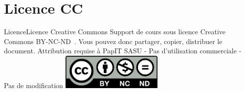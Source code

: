 \documentclass{beamer}
\begin{document}
    \section{Licence CC}\label{sec:licence}

    \begin{frame}{Licence}{Licence Creative Commons}
        Support de cours sous licence Creative Commons BY-NC-ND~.
        \bigbreak
        Vous pouvez donc partager, copier, distribuer le document.
        \bigbreak
        Attribution requise à PapIT SASU - Pas d’utilisation commerciale - Pas de modification
        \bigbreak
        \centering
        \includegraphics[width=5cm]{image/by-nc-nd-logo}
    \end{frame}
\end{document}
